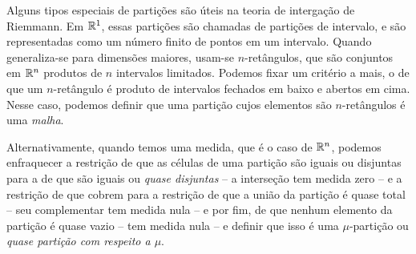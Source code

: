 Alguns tipos especiais de partições são úteis na teoria de intergação de Riemmann. Em $\mathbb{R}^1$, essas partições são chamadas de partições de intervalo, e são representadas como um número finito de pontos em um intervalo. Quando generaliza-se para dimensões maiores, usam-se $n$-retângulos, que são conjuntos em $\mathbb{R}^n$ produtos de $n$ intervalos limitados. Podemos fixar um critério a mais, o de que um $n$-retângulo é produto de intervalos fechados em baixo e abertos em cima. Nesse caso, podemos definir que uma partição cujos elementos são $n$-retângulos é uma \emph{malha}.

Alternativamente, quando temos uma medida, que é o caso de $\mathbb{R}^n$, podemos enfraquecer a restrição de que as células de uma partição são iguais ou disjuntas para a de que são iguais ou \emph{quase disjuntas} \--- a interseção tem medida zero \--- e a restrição de que cobrem para a restrição de que a união da partição é quase total \--- seu complementar tem medida nula \--- e por fim, de que nenhum elemento da partição é quase vazio \--- tem medida nula \--- e definir que isso é uma $\mu$-partição ou \emph{quase partição com respeito a $\mu$}.